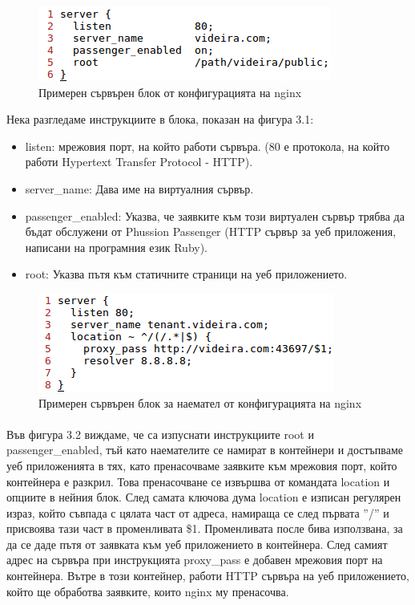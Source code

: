 \documentclass[pdftex,14pt,a4paper]{extreport}
\begin{document}
\begin{figure}[h]
  \centering
  \includegraphics[scale=0.8]{./snippets/nginx_main_server}
  \caption{Примерен сървърен блок от конфигурацията на nginx}
\end{figure}
Нека разгледаме инструкциите в блока, показан на фигура 3.1:
\begin{itemize}
  \item listen: мрежовия порт, на който работи сървъра. (80 е протокола, на който работи Hypertext Transfer Protocol - HTTP).
  \item server\_name: Дава име на виртуалния сървър.
  \item passenger\_enabled: Указва, че заявките към този виртуален сървър трябва да бъдат обслужени от Phussion Passenger (HTTP сървър за уеб приложения, написани на програмния език Ruby).
  \item root: Указва пътя към статичните страници на уеб приложението.
\end{itemize}
\begin{figure}[h]
  \centering
  \includegraphics[scale=0.8]{./snippets/nginx_tenant_server}
  \caption{Примерен сървърен блок за наемател от конфигурацията на nginx}
\end{figure}
\paragraph {}
Във фигура 3.2 виждаме, че са изпуснати инструкциите root и passenger\_enabled, тъй като наемателите се намират в контейнери и достъпваме уеб приложенията в тях, като пренасочваме заявките към мрежовия порт, който контейнера е разкрил. Това пренасочване се извършва от командата location и опциите в нейния блок. След самата ключова дума location е изписан регулярен израз, който съвпада с цялата част от адреса, намираща се след първата ''/'' и присвоява тази част в променливата \$1. Променливата после бива използвана, за да се даде пътя от заявката към уеб приложението в контейнера. След самият адрес на сървъра при инструкцията proxy\_pass е добавен мрежовия порт на контейнера. Вътре в този контейнер, работи HTTP сървъра на уеб приложението, който ще обработва заявките, които nginx му пренасочва.
\end{document}
